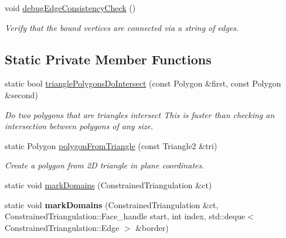 \begin{DoxyCompactItemize}
\mbox{\label{classpepr3d_1_1_triangle_detail_a0f5dfb297e953aba6b0ef3f80fede185}} 
void \mbox{\hyperlink{classpepr3d_1_1_triangle_detail_a0f5dfb297e953aba6b0ef3f80fede185}{debug\+Edge\+Consistency\+Check}} ()
\begin{DoxyCompactList}\small\item\em Verify that the bound vertices are connected via a string of edges. \end{DoxyCompactList}\end{DoxyCompactItemize}
\subsection*{Static Private Member Functions}
\begin{DoxyCompactItemize}
\item 
\mbox{\label{classpepr3d_1_1_triangle_detail_aa4a23f1168e2e50a4ea45ead29968204}} 
static bool \mbox{\hyperlink{classpepr3d_1_1_triangle_detail_aa4a23f1168e2e50a4ea45ead29968204}{triangle\+Polygons\+Do\+Intersect}} (const Polygon \&first, const Polygon \&second)
\begin{DoxyCompactList}\small\item\em Do two polygons that are triangles intersect This is faster than checking an intersection between polygons of any size. \end{DoxyCompactList}\item 
\mbox{\label{classpepr3d_1_1_triangle_detail_ab5e7973064972305de9c74d424d90225}} 
static Polygon \mbox{\hyperlink{classpepr3d_1_1_triangle_detail_ab5e7973064972305de9c74d424d90225}{polygon\+From\+Triangle}} (const Triangle2 \&tri)
\begin{DoxyCompactList}\small\item\em Create a polygon from 2D triangle in plane coordinates. \end{DoxyCompactList}\item 
static void \mbox{\hyperlink{classpepr3d_1_1_triangle_detail_a0b2324c84ed90dc0e4ad7d14cdd5aa75}{mark\+Domains}} (Constrained\+Triangulation \&ct)
\item 
\mbox{\label{classpepr3d_1_1_triangle_detail_a42d9d3fc7908f325cf64118061c6dea5}} 
static void {\bfseries mark\+Domains} (Constrained\+Triangulation \&ct, Constrained\+Triangulation\+::\+Face\+\_\+handle start, int index, std\+::deque$<$ Constrained\+Triangulation\+::\+Edge $>$ \&border)

\end{DoxyCompactItemize}
